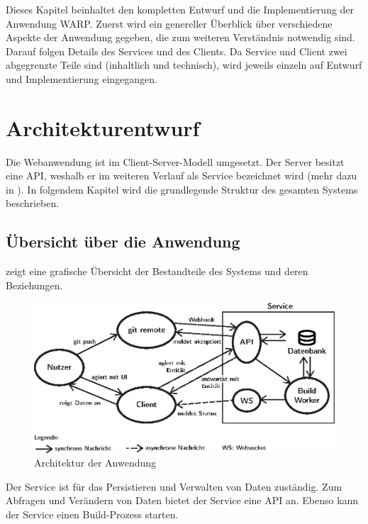 Dieses Kapitel beinhaltet den kompletten Entwurf und die Implementierung der Anwendung WARP. Zuerst wird ein genereller Überblick über verschiedene Aspekte der Anwendung gegeben, die zum weiteren Verständnis notwendig sind. Darauf folgen Details des Services und des Clients. Da Service und Client zwei abgegrenzte Teile sind (inhaltlich und technisch), wird jeweils einzeln auf Entwurf und Implementierung eingegangen.

\section{Architekturentwurf}
\label{sec:architektur}

Die Webanwendung ist im Client-Server-Modell umgesetzt. Der Server besitzt eine API, weshalb er im weiteren Verlauf als Service bezeichnet wird (mehr dazu in ). In folgendem Kapitel wird die grundlegende Struktur des gesamten Systems beschrieben.

\subsection{Übersicht über die Anwendung}
\label{subsec:uebersicht-anwendung}

 zeigt eine grafische Übersicht der Bestandteile des Systems und deren Beziehungen.

\begin{figure}[h]
  \caption{Architektur der Anwendung}
  \label{fig:architektur}
  \centering
    \includegraphics[width=\textwidth]{assets/systemarchitektur}
\end{figure}


Der Service ist für das Persistieren und Verwalten von Daten zuständig. Zum Abfragen und Verändern von Daten bietet der Service eine \ac{API} an. Ebenso kann der Service einen Build-Prozess starten.

